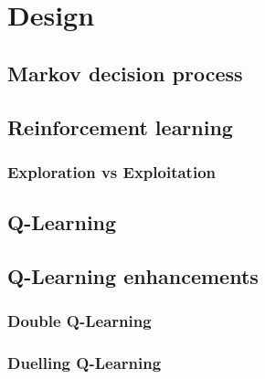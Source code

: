 \chapter{Design}
\section{Markov decision process}
\label{dsgn:sec:mdp}

\section{Reinforcement learning}
\label{dsgn:sec:rl}

\subsection{Exploration vs Exploitation}
\label{dsgn:sec:rl:expt-v-explor}

\section{Q-Learning}
\label{dsgn:sec:qlearning}

\section{Q-Learning enhancements}
\label{dsgn:sec:qlearning:qextra}

\subsection{Double Q-Learning}
\label{dsgn:sec:qlearning:doubledqn}

\subsection{Duelling Q-Learning}
\label{dsgn:sec:qlearning:dueldqn}
